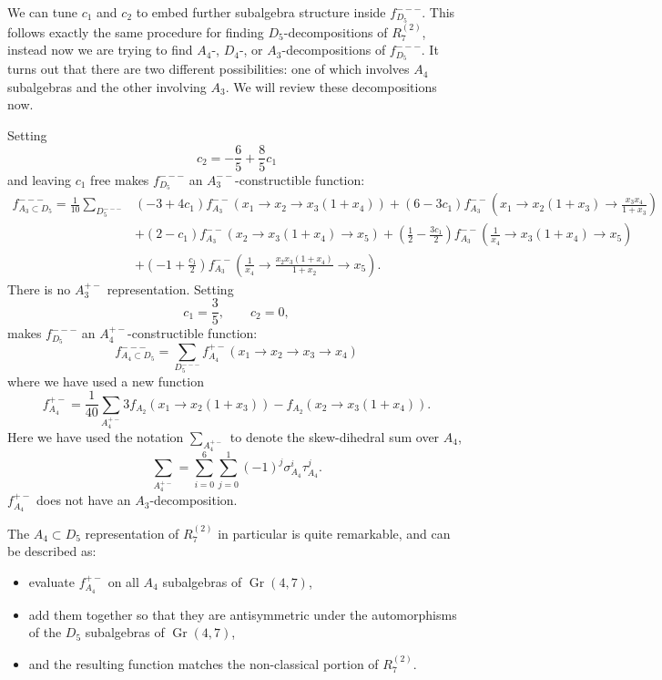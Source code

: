\documentclass[11pt]{article}
\DeclareMathOperator{\Gr}{Gr}
\def\nl{\nonumber\\}
\begin{document}
We can tune $c_1$ and $c_2$ to embed further subalgebra structure inside $f_{D_5}^{---}$. This follows exactly the same procedure for finding $D_5$-decompositions of $R^{(2)}_7$, instead now we are trying to find $A_4$-, $D_4$-, or $A_3$-decompositions of $f_{D_5}^{---}$. It turns out that there are two different possibilities: one of which involves $A_4$ subalgebras and the other involving $A_3$. We will review these decompositions now.

Setting 
\begin{equation}
	c_2 = -\frac{6}{5} + \frac{8}{5} c_1
\end{equation}
and leaving $c_1$ free makes $f_{D_5}^{---}$ an $A_3^{--}$-constructible function:
\begin{align}
	f_{A_3\subset D_5}^{---} = \frac{1}{10}\sum_{D_5^{---}}
	&\left(-3+4 c_1\right) f_{A_3}^{--}\left(x_1\to x_2\to x_3 \left(1+x_4\right)\right)
	+\left(6-3 c_1\right) f_{A_3}^{--}\left(x_1\to x_2 \left(1+x_3\right)\to \frac{x_3 x_4}{1+x_3}\right) \nl
	&+\left(2-c_1\right) f_{A_3}^{--}\left(x_2\to x_3 \left(1+x_4\right)\to x_5\right)+\left(\frac{1}{2}
	-\frac{3 c_1}{2}\right) f_{A_3}^{--}\left(\frac{1}{x_4}\to x_3 \left(1+x_4\right)\to x_5\right) \nl
	&+\left(-1+\frac{c_1}{2}\right) f_{A_3}^{--}\left(\frac{1}{x_4}\to \frac{x_2 x_3 \left(1+x_4\right)}{1+x_2}\to x_5\right).
\end{align}
There is no $A_3^{+-}$ representation. Setting 
\begin{equation}
	c_1 = \frac{3}{5}, \qquad c_2 = 0,
\end{equation}
makes $f_{D_5}^{---}$ an $A_4^{+-}$-constructible function:
\begin{equation}
	f_{A_4\subset D_5}^{---} = \sum_{D_5^{---}} f_{A_4}^{+-}(x_1\to x_2\to x_3 \to x_4)
\end{equation}
where we have used a new function
\begin{equation}\label{eq:fa4-def}
	f_{A_4}^{+-} = \frac{1}{40}\sum_{A_4^{+-}}3f_{A_2}(x_1 \to x_2(1+x_3)) - f_{A_2}(x_2\to x_3(1+x_4)).
\end{equation}
Here we have used the notation $\sum_{A_4^{+-}}$ to denote the skew-dihedral sum over $A_4$, 
\begin{equation}
 	\sum_{A_4^{+-}} = \sum_{i=0}^6\sum_{j=0}^1(-1)^j \sigma_{A_4}^i \tau_{A_4}^j.
\end{equation} 
$f_{A_4}^{+-}$ does not have an $A_3$-decomposition. 

The $A_4\subset D_5$ representation of $R^{(2)}_7$ in particular is quite remarkable, and can be described as: 
\begin{itemize}
	\item evaluate $f_{A_4}^{+-}$ on all $A_4$ subalgebras of $\Gr(4,7)$,
	\item add them together so that they are antisymmetric under the automorphisms of the $D_5$ subalgebras of $\Gr(4,7)$,
	\item and the resulting function matches the non-classical portion of $R^{(2)}_7$.
\end{itemize}
\end{document}
